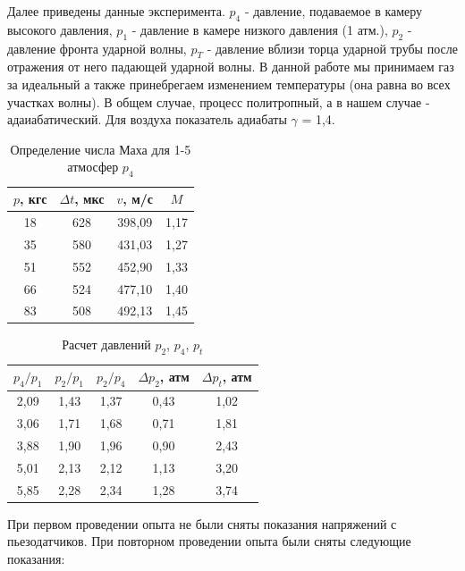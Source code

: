 \documentclass[a4paper,14pt]{article}
\begin{document}
Далее приведены данные эксперимента. $p_4$ - давление, подаваемое в камеру высокого давления, $p_1$ - давление в камере низкого давления (1 атм.), $p_2$ - давление фронта ударной волны, $p_T$ - давление вблизи торца ударной трубы после отражения от
него падающей ударной волны. В данной работе мы принимаем газ за идеальный а также принебрегаем изменением температуры (она равна во всех участках волны). В общем случае, процесс политропный, а в нашем случае - адаиабатический. Для воздуха показатель адиабаты $\gamma$ = 1,4.

\begin{table}[h]
    \centering
    
    \begin{tabular}{|c|c|c|c|}
        \hline 
        $p$, кгс & $\Delta t$, мкс & $v$, м/с & $M$ \\ \hline
        18 & 628 & 398,09 & 1,17 \\  \hline
        35 & 580 & 431,03 & 1,27 \\  \hline
        51 & 552 & 452,90 & 1,33 \\  \hline
        66 & 524 & 477,10 & 1,40 \\  \hline
        83 & 508 & 492,13 & 1,45 \\  \hline
    \end{tabular}
    \caption{Определение числа Маха для 1-5 атмосфер $p_4$}
\end{table}

\clearpage

\begin{table}[h]
    \centering
    
    \begin{tabular}{|c|c|c|c|c|} \hline
        $p_4/p_1$ & $p_2/p_1$ & $p_2/p_4$ & $\Delta p_2$, атм & $\Delta p_t$, атм\\ \hline
        2,09 & 1,43 & 1,37 & 0,43 & 1,02 \\ \hline
        3,06 & 1,71 & 1,68 & 0,71 & 1,81 \\ \hline
        3,88 & 1,90 & 1,96 & 0,90 & 2,43 \\ \hline
        5,01 & 2,13 & 2,12 & 1,13 & 3,20 \\ \hline
        5,85 & 2,28 & 2,34 & 1,28 & 3,74 \\ \hline
    \end{tabular}
    \caption{Расчет давлений $p_2$, $p_4$, $p_t$}
\end{table}

При первом проведении опыта не были сняты показания напряжений с пьезодатчиков. При повторном проведении опыта были сняты следующие показания:
\end{document}
